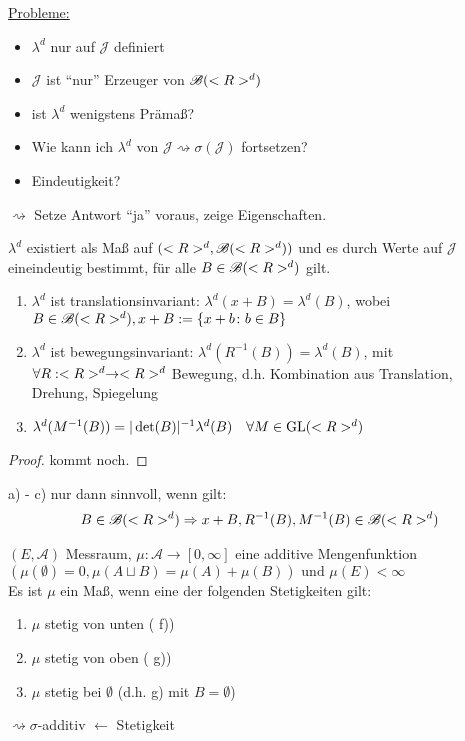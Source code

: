 \underline{Probleme:} 
\begin{itemize}
	\item $\lambda^d$ nur auf $\mathscr{J}$ definiert
	\item $\mathscr{J}$ ist ``nur'' Erzeuger von $\mathscr{B}(<R>^d)$
	\item ist $\lambda^d$ wenigstens Prämaß?
	\item Wie kann ich $\lambda^d$ von $\mathscr{J} \rightsquigarrow \sigma(\mathscr{J})$ fortsetzen?
	\item Eindeutigkeit?
\end{itemize}

$\rightsquigarrow$ Setze Antwort ``ja'' voraus, zeige Eigenschaften.

\begin{proposition}
	$\lambda^d$ existiert als Maß auf $(<R>^d, \mathscr{B}(<R>^d))$ und es durch Werte auf $\mathscr{J}$ eineindeutig bestimmt, für alle $B \in \mathscr{B}(<R>^d)$ gilt.
	\begin{enumerate}[label=(\alph*)]
		\item $\lambda^d$ ist translationsinvariant: $\lambda^d(x+B) = \lambda^d(B)$, wobei $B \in \mathscr{B}(<R>^d), x+B := \{x+b \colon b \in B\}$
		\item $\lambda^d$ ist bewegungsinvariant: $\lambda^d(R^{-1}(B)) = \lambda^d(B)$, mit $\forall R:<R>^d \to <R>^d$ Bewegung, d.h. Kombination aus Translation, Drehung, Spiegelung
		\item $\lambda^d(M^{-1}(B)) = \vert \det(B)\vert^{-1} \lambda^d(B)\quad \forall M \in \operatorname{GL}(<R>^d)$
	\end{enumerate}
\end{proposition}

\begin{proof}
	kommt noch. %
\end{proof}

\begin{hint}
	a) - c) nur dann sinnvoll, wenn gilt:
	\begin{align}
		B \in \mathscr{B}(<R>^d) \Rightarrow x+B, R^{-1}(B), M^{-1}(B) \in \mathscr{B}(<R>^d) \notag
	\end{align}
\end{hint}

\begin{lemma}
	$(E, \mathscr{A})$ Messraum, $\mu: \mathscr{A} \to [0, \infty]$ eine additive Mengenfunktion $(\mu(\emptyset) =0, \mu(A\sqcup B) = \mu(A) + \mu(B)) \text{ und } \mu(E) < \infty$\\
	Es ist $\mu$ ein Maß, wenn eine der folgenden Stetigkeiten gilt:
	\begin{enumerate}[label=(\alph*)]
		\item $\mu$ stetig von unten ( f))
		\item $\mu$ stetig von oben ( g))
		\item $\mu$ stetig bei $\emptyset$ (d.h.  g) mit $B = \emptyset$)
	\end{enumerate}
	$\rightsquigarrow \sigma$-additiv $\longleftarrow$ Stetigkeit
\end{lemma}

